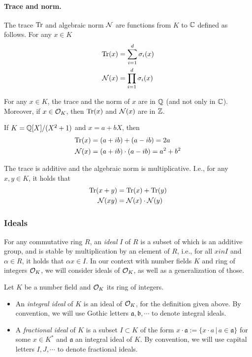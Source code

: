 \paragraph{Trace and norm.} The trace $\mathrm{Tr}$ and algebraic norm $\mathcal{N}$ are functions from $K$ to $\mathbb{C}$ defined as follows. For any $x \in K$
\begin{align*}
\mathrm{Tr}(x) &= \sum_{i = 1}^d \sigma_i(x) \\
\mathcal{N}(x) &= \prod_{i = 1}^d \sigma_i(x)
\end{align*}
\begin{lemma}
For any $x \in K$, the trace and the norm of $x$ are in $\mathbb{Q}$ (and not only in $\mathbb{C}$). Moreover, if $x \in \mathcal{O}_K$, then $\mathrm{Tr}(x)$ and $\mathcal{N}(x)$ are in $\mathbb{Z}$.
\end{lemma}

\begin{example}
If $K = \mathbb{Q}[X]/(X^2+1)$ and $x = a+bX$, then
\begin{align*}
\mathrm{Tr}(x) &= (a+ib) + (a-ib) = 2a \\
\mathcal{N}(x) &= (a+ib) \cdot (a-ib) = a^2+b^2
\end{align*}
\end{example}

\begin{lemma}
The trace is additive and the algebraic norm is multiplicative. I.e., for any $x, y \in K$, it holds that
\begin{align*}
\mathrm{Tr}(x+y) &= \mathrm{Tr}(x) + \mathrm{Tr}(y) \\
\mathcal{N}(xy) &= \mathcal{N}(x) \cdot \mathcal{N}(y)
\end{align*}
\end{lemma}

\subsubsection{Ideals} For any commutative ring $R$, an \emph{ideal} $I$ of $R$ is a subset of which is an additive group, and is stable by multiplication by an element of $R$, i.e., for all $x in I$ and $\alpha \in R$, it holds that $\alpha x \in I$. In our context with number fields $K$ and ring of integers $\mathcal{O}_K$, we will consider ideals of $\mathcal{O}_K$, as well as a generalization of those.

\begin{definition}
Let $K$ be a number field and $\mathcal{O}_K$ its ring of integers.
\begin{itemize}
\item An \emph{integral ideal} of $K$ is an ideal of $\mathcal{O}_K$, for the definition given above. By convention, we will use Gothic letters $\mathfrak{a}, \mathfrak{b}, \cdots$ to denote integral ideals.
\item A \emph{fractional ideal} of $K$ is a subset $I \subset K$ of the form $x \cdot \mathfrak{a} := \{x \cdot a\,|\, a \in \mathfrak{a}\}$ for some $x \in K^*$ and $\mathfrak{a}$ an integral ideal of $K$. By convention, we will use capital letters $I, J, \cdots$ to denote fractional ideals.
\end{itemize}
\end{definition}

